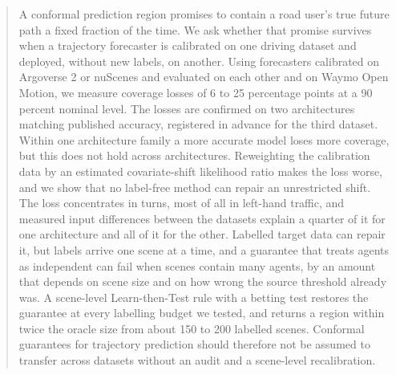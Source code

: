 \begin{abstract}
A conformal prediction region promises to contain a road user's true future path a fixed fraction of the time. We ask
whether that promise survives when a trajectory forecaster is calibrated on one driving dataset and deployed, without
new labels, on another. Using forecasters calibrated on Argoverse 2 or nuScenes and evaluated on each other and on
Waymo Open Motion, we measure coverage losses of 6 to 25 percentage points at a 90 percent nominal level. The losses
are confirmed on two architectures matching published accuracy, registered in advance for the third dataset. Within
one architecture family a more accurate model loses more coverage, but this does not hold across architectures.
Reweighting the calibration data by
an estimated covariate-shift likelihood ratio makes the loss worse, and we show that no label-free method can repair
an unrestricted shift. The loss concentrates in turns, most of all in left-hand traffic, and measured input
differences between the datasets explain a quarter of it for one architecture and all of it for the other. Labelled target data can repair it, but labels
arrive one scene at a time, and a guarantee that treats agents as independent can fail when scenes contain many
agents, by an amount that depends on scene size and on how wrong the source threshold already was. A scene-level
Learn-then-Test rule with a
betting test restores the guarantee at every labelling budget we tested, and returns a region within twice the oracle
size from about 150 to 200 labelled scenes. Conformal guarantees for trajectory prediction should therefore not be
assumed to transfer across datasets without an audit and a scene-level recalibration.
\end{abstract}
